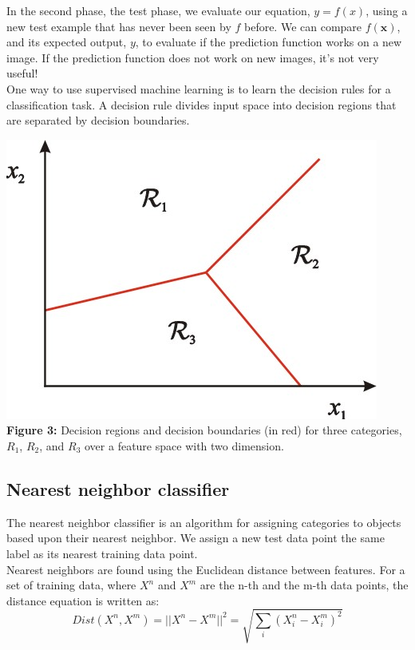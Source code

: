 \documentclass{article}
\begin{document}
In the second phase, the test phase, we evaluate our equation, $y=f(x)$, using a new test example that has never been seen by $f$ before. We can compare $f(\mathbf{x})$, and its expected output, $y$, to evaluate if the prediction function works on a new image. If the prediction function does not work on new images, it's not very useful!\\

One way to use supervised machine learning is to learn the decision rules for a classification task.  A decision rule divides input space into decision regions that are separated by decision boundaries.

\begin{center}
	\includegraphics[scale=0.5]{decision_boudnaries.jpg}\\
    \textbf{Figure 3:} Decision regions and decision boundaries (in red) for three categories, $R_1$, $R_2$, and $R_3$ over a feature space with two dimension. \citeauthor{lecture11}\\
\end{center}

\subsection{Nearest neighbor classifier}
The nearest neighbor classifier is an algorithm for assigning categories to objects based upon their nearest neighbor. We assign a new test data point the same label as its nearest training data point.\\

Nearest neighbors are found using the Euclidean distance between features. For a set of training data, where $X^n$ and $X^m$ are the n-th and the m-th data points, the distance equation is written as:
\begin{equation}
Dist(X^n, X^m) = ||X^n - X^m||^2 = \sqrt{\sum_{i}(X^n_i - X^m_i)^2}
\end{equation}
\end{document}
